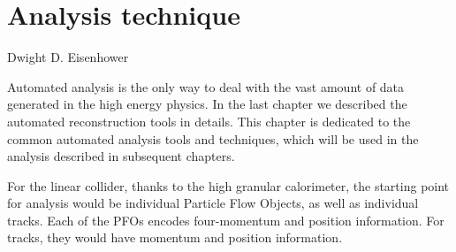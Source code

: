 \chapter{Analysis technique}
\label{chap:Reconstruction}

%
{Dwight D. Eisenhower}%

Automated analysis is the only way to deal with the vast amount of data generated in the high energy physics. In the last chapter we described the automated reconstruction tools in details. This chapter is dedicated to the common automated analysis tools and techniques, which will be used in the analysis described in subsequent chapters.

For the linear collider, thanks to the high granular calorimeter, the starting point for analysis would be individual Particle Flow Objects, as well as individual tracks. Each of the PFOs encodes four-momentum and position information. For tracks, they would have momentum and position information.

